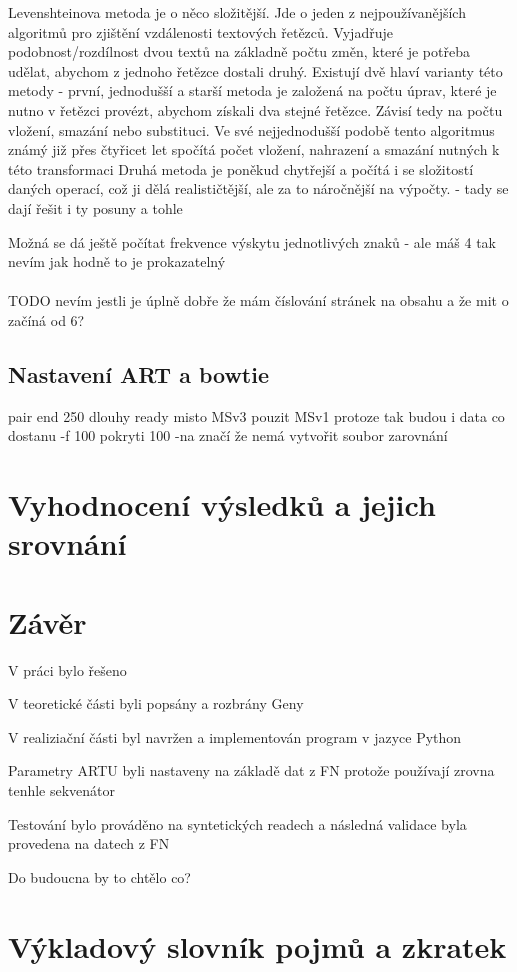\documentclass[czech,DP]{thesiskiv}
\numberwithin{equation}{section}
\begin{document}
Levenshteinova metoda je o něco složitější. Jde o jeden z nejpoužívanějších algoritmů
pro zjištění vzdálenosti textových řetězců. Vyjadřuje podobnost/rozdílnost dvou textů na
základně počtu změn, které je potřeba udělat, abychom z jednoho řetězce dostali druhý.
Existují dvě hlaví varianty této metody - první, jednodušší a starší metoda je založená
na počtu úprav, které je nutno v řetězci provézt, abychom získali dva stejné řetězce.
Závisí tedy na počtu vložení, smazání nebo substituci. Ve své nejjednodušší podobě tento
algoritmus známý již přes čtyřicet let spočítá počet vložení, nahrazení a smazání nutných
k této transformaci
Druhá metoda je poněkud chytřejší a počítá i se složitostí daných operací, což ji dělá
realističtější, ale za to náročnější na výpočty.
- tady se dají řešit i ty posuny a tohle

Možná se dá ještě počítat frekvence výskytu jednotlivých znaků - ale máš 4 tak nevím jak hodně to je prokazatelný
\\
\\
TODO nevím jestli je úplně dobře že mám číslování stránek na obsahu a že mit o začíná od 6?
\section{Nastavení ART a bowtie}

pair end
250 dlouhy ready
misto MSv3 pouzit MSv1 protoze tak budou i data co dostanu
-f 100 pokryti 100
-na značí že nemá vytvořit soubor zarovnání
\chapter{Vyhodnocení výsledků a jejich srovnání}
\chapter{Závěr}
V práci bylo řešeno 

V teoretické části byli popsány a rozbrány Geny 

V realiziační části byl navržen a implementován program v jazyce Python 

Parametry ARTU byli nastaveny na základě dat z FN protože používají zrovna tenhle sekvenátor

Testování bylo prováděno na syntetických readech a následná validace byla provedena na datech z FN

Do budoucna by to chtělo co?

\chapter{Výkladový slovník pojmů a zkratek}
\end{document}
